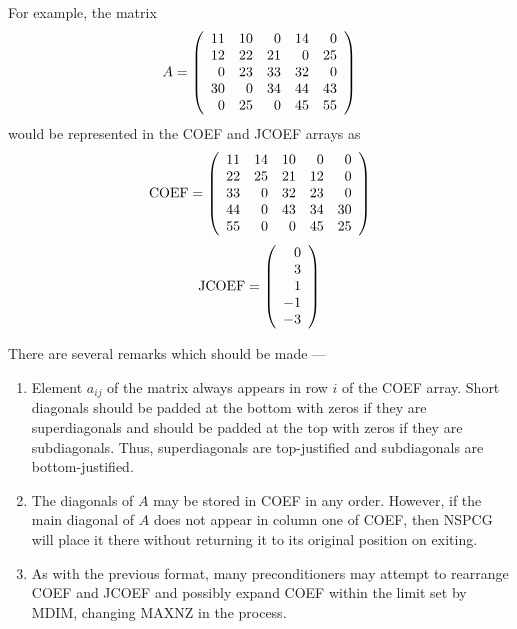 \begin{description}
  For example, the matrix
  \[
     A = \left( \begin{array}{rrrrr}
                 11 & 10 &  0 & 14 &  0 \\
                 12 & 22 & 21 &  0 & 25 \\
                  0 & 23 & 33 & 32 &  0 \\
                 30 &  0 & 34 & 44 & 43 \\
                  0 & 25 &  0 & 45 & 55
        \end{array} \right)
  \]
  would be represented in the COEF and JCOEF arrays as
  \[
     \mbox{COEF} = \left( \begin{array}{rrrrr}
            11 & 14 & 10 &  0 &  0 \\
            22 & 25 & 21 & 12 &  0 \\
            33 &  0 & 32 & 23 &  0 \\
            44 &  0 & 43 & 34 & 30 \\
            55 &  0 &  0 & 45 & 25
      \end{array} \right)
  \]
  \[
     \mbox{JCOEF} = \left( \begin{array}{r}
             0 \\
             3 \\
             1 \\
            -1 \\
            -3
      \end{array} \right)
  \]
 
  There are several remarks which should be made ---
  \begin{enumerate}
  \item
       Element $a_{ij}$ of the matrix always appears in row $i$ of
       the COEF array.  Short diagonals should be padded at the
       bottom with zeros if they are superdiagonals and should
       be padded at the top with zeros if they are subdiagonals.
       Thus, superdiagonals are top-justified and subdiagonals
       are bottom-justified.
  \item
       The diagonals of $A$ may be stored in COEF in any order.
       However, if the main diagonal of $A$ does not appear in
       column one of COEF, then NSPCG will place it there
       without returning it to its original position on exiting.
  \item
       As with the previous format, many preconditioners may
       attempt to rearrange COEF and JCOEF and possibly expand
       COEF within the limit set by MDIM, changing MAXNZ in the
       process.
  \end{enumerate}
 

\end{description}
